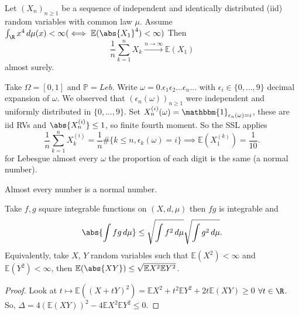 \documentclass{article}
\newcommand{\1}[1]{\mathbbm{1}_{#1}}
\begin{document}
\begin{thm}
    Let $(X_n)_{n \geq 1}$ be a sequence of independent and identically distributed (iid) random variables with common law $\mu$.
    Assume $\int_\R x^4 \, d\mu(x) < \infty (\iff \mathbb{E}(\abs{X_1}^4) < \infty)$
    Then
    \begin{equation*}
        \frac{1}{n} \sum_{k=1}^n X_k \xrightarrow{n \to \infty} \mathbb{E}(X_1)
    \end{equation*}
    almost surely.
\end{thm}

\begin{eg}
    Take $\Omega = [0, 1]$ and $\mathbb{P} = Leb$. Write $\omega = 0.\epsilon_1 \epsilon_2 \dotsc \epsilon_n \dotsc$ with $\epsilon_i \in \{0, \dotsc, 9\}$ decimal expansion of $\omega$.
    We observed that $(\epsilon_n(\omega))_{n \geq 1}$ were independent and uniformly distributed in $\{0, \dotsc, 9\}$.
    Set $X_n^{(i)} (\omega) = \1{\epsilon_n(\omega) = i}$, these are iid RVs and $\abs{X_n^{(i)}} \leq 1$, so finite fourth moment.
    So the SSL applies
    \begin{equation*}
        \frac{1}{n} \sum_{k=1}^n X_k^{(i)} = \frac{1}{n} \# \{k \leq n, \epsilon_k(\omega) = i\} \implies \mathbb{E}(X_1^{(k)}) = \frac{1}{10}.
    \end{equation*}
    for Lebesgue almost every $\omega$ the proportion of each digit is the same (a normal number).
\end{eg}
\begin{thm}[Borel]
    Almost every number is a normal number.
\end{thm}

\begin{lemma}
    Take $f, g$ square integrable functions on $(X, d, \mu)$ then $fg$ is integrable and
    \begin{equation*}
        \abs{\int fg \, d\mu} \leq \sqrt{\int f^2 \, d\mu} \sqrt{\int g^2 \, d \mu}.
    \end{equation*}
    Equivalently, take $X$, $Y$ random variables such that $\mathbb{E}(X^2) < \infty$ and $\mathbb{E}(Y^2) < \infty$, then $\mathbb{E}(\abs{XY}) \leq \sqrt{\mathbb{E}X^2 \mathbb{E}Y^2}$.
\end{lemma}

\begin{proof}
    Look at $t \mapsto \mathbb{E}((X + t Y)^2) = \mathbb{E}X^2 + t^2 \mathbb{E} Y^2 + 2 t \mathbb{E}(XY) \geq 0$ $\forall t \in \R$.
    So, $\Delta = 4 (\mathbb{E}(XY))^2 - 4 \mathbb{E}X^2 \mathbb{E}Y^2 \leq 0$.
\end{proof}
\end{document}
